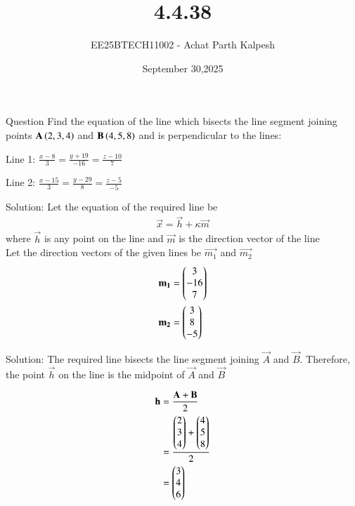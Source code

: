 \documentclass{beamer}
\title %
{4.4.38}
\date{September 30,2025}
\author %
{EE25BTECH11002 - Achat Parth Kalpesh}
\begin{document}
\frame{\titlepage}

\begin{frame}{Question}
  Find the equation of the line which bisects the line segment joining points $\mathbf{A}\left(2,3,4\right)$ and $\mathbf{B}\left(4,5,8\right)$ and is perpendicular to the lines:
  
  \vspace{1em}
  
  Line 1: $\frac{x-8}{3} = \frac{y+19}{-16} = \frac{z-10}{7}$
  
  \vspace{1em}
  
  Line 2: $\frac{x-15}{3} = \frac{y-29}{8} = \frac{z-5}{-5}$
\end{frame}

\begin{frame}{Solution:}
Let the equation of the required line be 
\begin{align}
    \vec{x} = \vec{h} + \kappa \vec{m}
\end{align}
where $\vec{h}$ is any point on the line and
$\vec{m}$ is the direction vector of the line\\
Let the direction vectors of the given lines be $\vec{m_1}$ and  $\vec{m_2}$  
\begin{align}
    \mathbf{m_1} &= \begin{pmatrix}3\\-16\\7\end{pmatrix} \\
    \mathbf{m_2} &= \begin{pmatrix}3\\8\\-5\end{pmatrix}
\end{align}
\end{frame}

\begin{frame}{Solution:}
  The required line bisects the line segment joining $\vec{A}$ and $\vec{B}$. Therefore, the point $\vec{h}$ on the line is the midpoint of $\vec{A}$ and $\vec{B}$
  
  \begin{align*}
    \mathbf{h} &= \frac{\mathbf{A} + \mathbf{B}}{2} \\
            &= \frac{\begin{pmatrix}2 \\ 3 \\ 4\end{pmatrix} + \begin{pmatrix}4 \\ 5 \\ 8\end{pmatrix}}{2} \\
            &= \begin{pmatrix}3 \\ 4 \\ 6\end{pmatrix}
  \end{align*}
\end{frame}
\end{document}

